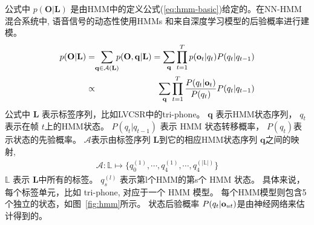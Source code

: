 公式中 $p(\mathbf{O}|\mathbf{L})$ 是由HMM中的定义公式(\ref{eq:hmm-basic})给定的。在NN-HMM 混合系统中, 语音信号的动态性使用HMMs 和来自深度学习模型的后验概率进行建模。
\begin{eqnarray}
\label{equ:hmm-model_2}
p(\mathbf{O}|\mathbf{L})&=&\!\!\!\!\!\!\sum_{\mathbf{q}\in\mathcal{A}(\mathbf{L})}\!\!\!p(\mathbf{O},\mathbf{q}|{\mathbf L}) =\sum_{\mathbf{q}}\prod_{t=1}^{T} p({\bf o}_{t}|q_t) P(q_t|q_{t-1})\nonumber\\
&\propto&\sum_{\mathbf{q}}\prod_{t=1}^{T} \frac{P(q_t|{\bf o}_{t})}{P(q_t)}P(q_t|q_{t-1})
\end{eqnarray}
公式中 $\mathbf{L}$ 表示标签序列，比如LVCSR中的tri-phone。
$\mathbf{q}$ 表示HMM状态序列，  $q_t$ 表示在帧 $t$上的HMM状态。 $P(q_t|q_{t-1})$ 表示 HMM 状态转移概率， $P(q_t)$表示状态的先验概率。
$\mathcal{A}$表示由标签序列 $\mathbf{L}$到它的相应HMM状态序列 $\mathbf{q}$之间的映射,
\begin{equation}
\label{equ:a-func_2}
\begin{split}
\mathcal{A}:\mathbb{L}  \mapsto \{ q_0^{(1)},\cdots,q_4^{(1)},\cdots,q_4^{(|\mathbb{L}|)} \}
\end{split}
\end{equation}
$\mathbb{L}$ 表示 $\mathbf{L}$中所有的标签。 $q_s^{(l)}$ 表示第l个HMM的第s个 HMM 状态。
具体来说，每个标签单元，比如 tri-phone, 对应于一个 HMM 模型。
每个HMM模型则包含5个独立的状态，如图~\ref{fig:hmm}所示。
状态后验概率 $P(q_t|{\bf o}_{ut})$是由神经网络来估计得到的。


